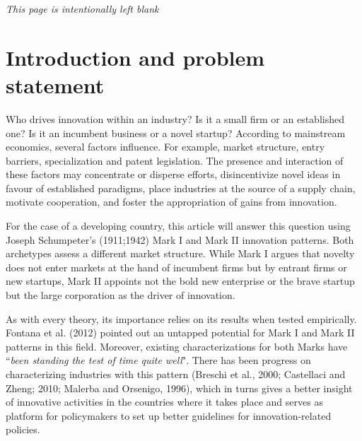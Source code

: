 \documentclass[12pt,a4paper]{article}
\begin{document}
\newpage

\vspace*{\fill}

\begin{center}
	\textit{This page is intentionally left blank}
\end{center}

\vspace*{\fill}

\pagebreak
	
	
\tableofcontents \newpage
\listoffigures
\listoftables \newpage
{}
\setcounter{page}{1}



\section{Introduction and problem statement}
	
Who drives innovation within an industry? Is it a small firm or an established one? Is it an incumbent business or a novel startup? According to mainstream economics, several factors influence. For example, market structure, entry barriers, specialization and patent legislation. The presence and interaction of these factors may concentrate or disperse efforts, disincentivize novel ideas in favour of established paradigms, place industries at the source of a supply chain, motivate cooperation, and foster the appropriation of gains from innovation.    

For the case of a developing country, this article will answer this question using Joseph Schumpeter’s (1911;1942) Mark I and Mark II innovation patterns. Both archetypes assess a different market structure. While Mark I argues that novelty does not enter markets at the hand of incumbent firms but by entrant firms or new startups, Mark II appoints not the bold new enterprise or the brave startup but the large corporation as the driver of innovation.  

As with every theory, its importance relies on its results when tested empirically. Fontana et al. (2012) pointed out an untapped potential for Mark I and Mark II patterns in this field. Moreover, existing characterizations for both Marks have “\textit{been standing the test of time quite well}". There has been progress on characterizing industries with this pattern (Breschi et al., 2000; Castellaci and Zheng; 2010; Malerba and Orsenigo, 1996), which in turns gives a better insight of innovative activities in the countries where it takes place and serves as platform for policymakers to set up better guidelines for innovation-related policies.  
\end{document}
